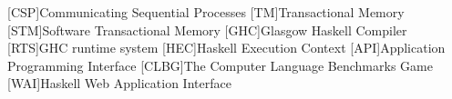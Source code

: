 \begin{acronym}[ACRONYM]
[CSP]{Communicating Sequential Processes}
[TM]{Transactional Memory}
[STM]{Software Transactional Memory}
[GHC]{Glasgow Haskell Compiler}
[RTS]{GHC runtime system}
[HEC]{Haskell Execution Context}
[API]{Application Programming Interface}
[CLBG]{The Computer Language Benchmarks Game}
[WAI]{Haskell Web Application Interface}
\end{acronym}
